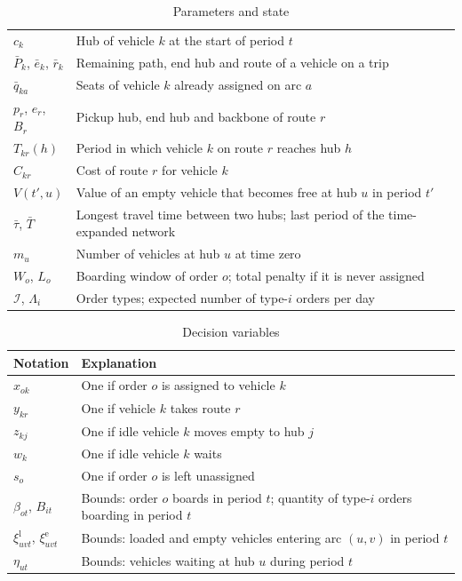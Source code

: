\documentclass[12pt]{article}
\theoremstyle{plain}
\theoremstyle{definition}
\begin{document}
\begin{table}[h]
\begin{tabular}{l p{}}
        $c_k$ & Hub of vehicle $k$ at the start of period $t$\\
        $\bar P_k$, $\bar e_k$, $\bar r_k$ & Remaining path, end hub and route of a vehicle on a trip\\
        $\bar q_{ka}$ & Seats of vehicle $k$ already assigned on arc $a$\\
        $p_r$, $e_r$, $B_r$ & Pickup hub, end hub and backbone of route $r$\\
        $T_{kr}(h)$ & Period in which vehicle $k$ on route $r$ reaches hub $h$\\
        $C_{kr}$ & Cost of route $r$ for vehicle $k$\\
        $V(t',u)$ & Value of an empty vehicle that becomes free at hub $u$ in period $t'$\\
        $\bar\tau$, $\bar T$ & Longest travel time between two hubs; last period of the time-expanded network\\
        $m_u$ & Number of vehicles at hub $u$ at time zero\\
        $W_o$, $L_o$ & Boarding window of order $o$; total penalty if it is never assigned\\
        $\mathcal{I}$, $\Lambda_i$ & Order types; expected number of type-$i$ orders per day\\
        \bottomrule
    \end{tabular}
    \caption{Parameters and state}
    \label{tab:params}
\end{table}

\begin{table}[h]
    \centering
    \begin{tabular}{l p{}}
        \toprule
        Notation & Explanation \\
        \midrule
        $x_{ok}$ & One if order $o$ is assigned to vehicle $k$\\
        $y_{kr}$ & One if vehicle $k$ takes route $r$\\
        $z_{kj}$ & One if idle vehicle $k$ moves empty to hub $j$\\
        $w_k$ & One if idle vehicle $k$ waits\\
        $s_o$ & One if order $o$ is left unassigned\\
        $\beta_{ot}$, $B_{it}$ & Bounds: order $o$ boards in period $t$; quantity of type-$i$ orders boarding in period $t$\\
        $\xi^{\mathrm{l}}_{uvt}$, $\xi^{\mathrm{e}}_{uvt}$ & Bounds: loaded and empty vehicles entering arc $(u,v)$ in period $t$\\
        $\eta_{ut}$ & Bounds: vehicles waiting at hub $u$ during period $t$\\
        \bottomrule
    \end{tabular}
    \caption{Decision variables}
    \label{tab:vars}
\end{table}
\end{document}
